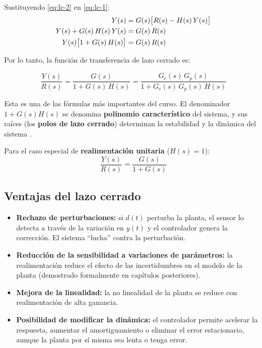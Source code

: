 Sustituyendo \eqref{eq:lc-2} en \eqref{eq:lc-1}:
\begin{align}
  Y(s) &= G(s)\bigl[R(s) - H(s)\,Y(s)\bigr] \notag\\
  Y(s) + G(s)\,H(s)\,Y(s) &= G(s)\,R(s) \notag\\
  Y(s)\bigl[1 + G(s)\,H(s)\bigr] &= G(s)\,R(s)
\end{align}

Por lo tanto, la función de transferencia de lazo cerrado es:

\begin{resultado}
  \begin{equation}
    \frac{Y(s)}{R(s)} = \frac{G(s)}{1 + G(s)\,H(s)}
    = \frac{G_c(s)\,G_p(s)}{1 + G_c(s)\,G_p(s)\,H(s)}
    \label{eq:ftlc}
  \end{equation}
\end{resultado}

Esta es una de las fórmulas más importantes del curso. El denominador
$1 + G(s)H(s)$ se denomina \textbf{polinomio característico} del sistema,
y sus raíces (los \textbf{polos de lazo cerrado}) determinan la estabilidad
y la dinámica del sistema .

Para el caso especial de \textbf{realimentación unitaria} ($H(s) = 1$):
\begin{equation}
  \frac{Y(s)}{R(s)} = \frac{G(s)}{1 + G(s)}
  \label{eq:ftlc-unitaria}
\end{equation}

\subsection{Ventajas del lazo cerrado}

\begin{itemize}
  \item \textbf{Rechazo de perturbaciones:} si $d(t)$ perturba la planta,
    el sensor lo detecta a través de la variación en $y(t)$ y el controlador
    genera la corrección. El sistema ``lucha'' contra la perturbación.
  \item \textbf{Reducción de la sensibilidad a variaciones de parámetros:}
    la realimentación reduce el efecto de las incertidumbres en el modelo
    de la planta (demostrado formalmente en capítulos posteriores).
  \item \textbf{Mejora de la linealidad:} la no linealidad de la planta
    se reduce con realimentación de alta ganancia.
  \item \textbf{Posibilidad de modificar la dinámica:} el controlador permite
    acelerar la respuesta, aumentar el amortiguamiento o eliminar el error
    estacionario, aunque la planta por sí misma sea lenta o tenga error.
\end{itemize}

